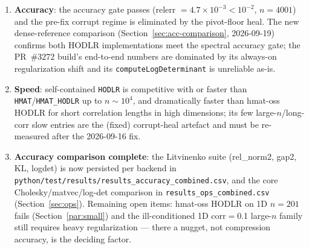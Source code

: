 \documentclass[11pt,a4paper]{article}
\begin{document}
\begin{enumerate}
\item \textbf{Accuracy}: the accuracy gate passes (relerr
  $=4.7\times10^{-3}<10^{-2}$, $n=4001$) and the pre-fix corrupt regime is
  eliminated by the pivot-floor heal.  The new dense-reference comparison
  (Section~\ref{sec:acc-comparison}, 2026-09-19) confirms both HODLR
  implementations meet the spectral accuracy gate; the PR~\#3272 build's
  end-to-end numbers are dominated by its always-on regularization shift and its
  \texttt{computeLogDeterminant} is unreliable as-is.
\item \textbf{Speed}: self-contained \texttt{HODLR} is competitive with or faster
  than \texttt{HMAT}/\texttt{HMAT\_HODLR} up to $n\sim10^{4}$, and dramatically
  faster than hmat-oss HODLR for short correlation lengths in high dimensions;
  its few large-$n$/long-corr slow entries are the (fixed) corrupt-heal artefact
  and must be re-measured after the 2026-09-16 fix.
\item \textbf{Accuracy comparison complete}: the Litvinenko suite
  (rel\_norm2, gap2, KL, logdet) is now persisted per backend in
  \texttt{python/test/results/results\_accuracy\_combined.csv}, and the core
  Cholesky/matvec/log-det comparison in
  \texttt{results\_ops\_combined.csv}
  (Section~\ref{sec:ops}).  Remaining open items: hmat-oss HODLR on 1D
  $n{=}201$ fails (Section~\ref{par:small}) and the ill-conditioned 1D
  corr$=$0.1 large-$n$ family still requires heavy regularization --- there a
  nugget, not compression accuracy, is the deciding factor.
\end{enumerate}
\end{document}
